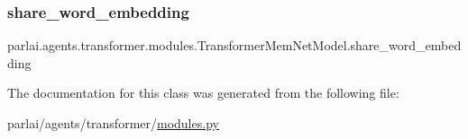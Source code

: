 \subsubsection{\texorpdfstring{share\+\_\+word\+\_\+embedding}{share\_word\_embedding}}
{\footnotesize\ttfamily parlai.\+agents.\+transformer.\+modules.\+Transformer\+Mem\+Net\+Model.\+share\+\_\+word\+\_\+embedding}



The documentation for this class was generated from the following file\+:\begin{DoxyCompactItemize}
\item 
parlai/agents/transformer/\hyperlink{parlai_2agents_2transformer_2modules_8py}{modules.\+py}\end{DoxyCompactItemize}
